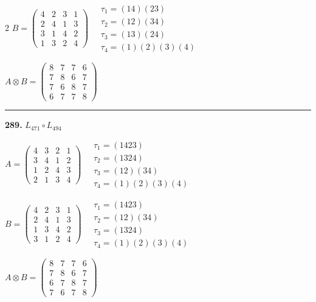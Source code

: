 \begin{multicols}{2}
$B = \begin{pmatrix} 4 & 2 & 3 & 1 \\ 2 & 4 & 1 & 3 \\ 3 & 1 & 4 & 2 \\ 1 & 3 & 2 & 4 \end{pmatrix} \quad \begin{matrix} \tau_{1}=(1 4)(2 3) \\ \tau_{2}=(1 2)(3 4) \\ \tau_{3}=(1 3)(2 4) \\ \tau_{4}=(1)(2)(3)(4) \end{matrix}$

$A \otimes B = \begin{pmatrix} 8 & 7 & 7 & 6 \\ 7 & 8 & 6 & 7 \\ 7 & 6 & 8 & 7 \\ 6 & 7 & 7 & 8 \end{pmatrix}$

\vspace{0.3em}
\hrule
\vspace{0.3em}

\noindent\textbf{289.} $L_{471} \circ L_{494}$

$A = \begin{pmatrix} 4 & 3 & 2 & 1 \\ 3 & 4 & 1 & 2 \\ 1 & 2 & 4 & 3 \\ 2 & 1 & 3 & 4 \end{pmatrix} \quad \begin{matrix} \tau_{1}=(1 4 2 3) \\ \tau_{2}=(1 3 2 4) \\ \tau_{3}=(1 2)(3 4) \\ \tau_{4}=(1)(2)(3)(4) \end{matrix}$

$B = \begin{pmatrix} 4 & 2 & 3 & 1 \\ 2 & 4 & 1 & 3 \\ 1 & 3 & 4 & 2 \\ 3 & 1 & 2 & 4 \end{pmatrix} \quad \begin{matrix} \tau_{1}=(1 4 2 3) \\ \tau_{2}=(1 2)(3 4) \\ \tau_{3}=(1 3 2 4) \\ \tau_{4}=(1)(2)(3)(4) \end{matrix}$

$A \otimes B = \begin{pmatrix} 8 & 7 & 7 & 6 \\ 7 & 8 & 6 & 7 \\ 6 & 7 & 8 & 7 \\ 7 & 6 & 7 & 8 \end{pmatrix}$


\end{multicols}
